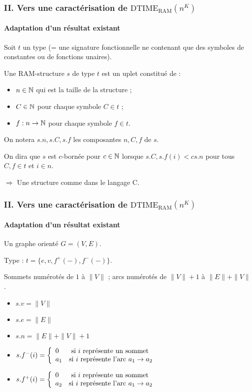 \documentclass[10pt]{beamer}
\newcommand{\dtimeram}{\text{DTIME}_{\text{RAM}}\left( n^K \right)}
\begin{document}
	
	\begin{frame}
		\frametitle{II. Vers une caractérisation de $\dtimeram$}
		\framesubtitle{Adaptation d'un résultat existant}
		
		\begin{defn}
			Soit $t$ un type (= une signature fonctionnelle ne contenant que des symboles de constantes ou de fonctions unaires).
			
			Une RAM-structure $s$ de type $t$ est un uplet constitué de :
			\begin{itemize}[itemsep=-1mm]
				\item 	$n \in \mathbb{N}$ qui est la taille de la structure ;
				\item 	$C \in \mathbb{N}$ pour chaque symbole $C \in t$ ;
				\item 	$f : n \to \mathbb{N}$ pour chaque symbole $f \in t$.
			\end{itemize}
			
			On notera $s.n, s.C, s.f$ les composantes $n, C, f$ de $s$.
			
			On dira que $s$ est $c$-bornée pour $c\in\mathbb{N}$ lorsque $s.C, s.f(i) < c s.n$ pour tous $C, f \in t$ et $i \in n$.
		\end{defn}
		
		$\Rightarrow$ Une structure comme dans le langage C.
		
	\end{frame}
	
	\begin{frame}
		\frametitle{II. Vers une caractérisation de $\dtimeram$}
		\framesubtitle{Adaptation d'un résultat existant}

		\begin{exemple}
			Un graphe orienté $G = (V,E)$.
			
			Type : $t = \{ e, v, f^+(-), f^-(-) \}$.
			
			Sommets numérotés de $1$ à $\| V\|$ ; arcs numérotés de $\| V\| +1 $ à $\| E \| + \| V \|$.
			
			\begin{itemize}
				\item 	$s.v = \| V \|$
				\item 	$s.e = \| E \|$
				\item 	$s.n = \| E \| + \| V \| + 1$
				\item 	$s.f^-(i) = \left\lbrace \begin{array}{ll} 
										0 & \text{ si $i$ représente un sommet} \\
										a_1 & \text{si $i$ représente l'arc $a_1 \to a_2$}
										 \end{array} \right.$
				\item 	$s.f^+(i) = \left\lbrace \begin{array}{ll} 
										0 & \text{ si $i$ représente un sommet} \\
										a_2 & \text{si $i$ représente l'arc $a_1 \to a_2$}
									 \end{array} \right.$
			\end{itemize}
		\end{exemple}
	\end{frame}
		
\end{document}
